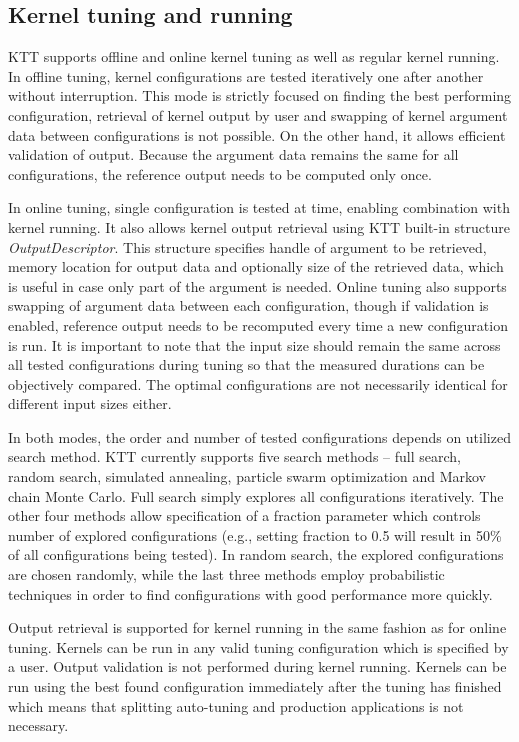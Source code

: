 \documentclass
[
    digital, %
    oneside, %
    table, %
    nolof, %
    nolot, %
    nocover %
]{fithesis3}
\begin{document}
\subsection{Kernel tuning and running}
KTT supports offline and online kernel tuning as well as regular kernel running. In offline tuning, kernel configurations are tested iteratively one
after another without interruption. This mode is strictly focused on finding the best performing configuration, retrieval of kernel output by user and
swapping of kernel argument data between configurations is not possible. On the other hand, it allows efficient validation of output. Because the
argument data remains the same for all configurations, the reference output needs to be computed only once.

In online tuning, single configuration is tested at time, enabling combination with kernel running. It also allows kernel output retrieval using
KTT built-in structure \textit{OutputDescriptor}. This structure specifies handle of argument to be retrieved, memory location for output data and
optionally size of the retrieved data, which is useful in case only part of the argument is needed. Online tuning also supports swapping of argument
data between each configuration, though if validation is enabled, reference output needs to be recomputed every time a new configuration is run.
It is important to note that the input size should remain the same across all tested configurations during tuning so that the measured durations
can be objectively compared. The optimal configurations are not necessarily identical for different input sizes either.

In both modes, the order and number of tested configurations depends on utilized search method. KTT currently supports five search methods -- full
search, random search, simulated annealing, particle swarm optimization and Markov chain Monte Carlo. Full search simply explores all configurations
iteratively. The other four methods allow specification of a fraction parameter which controls number of explored configurations (e.g., setting fraction
to 0.5 will result in 50\% of all configurations being tested). In random search, the explored configurations are chosen randomly, while the last three
methods employ probabilistic techniques in order to find configurations with good performance more quickly.

Output retrieval is supported for kernel running in the same fashion as for online tuning. Kernels can be run in any valid tuning configuration which is
specified by a user. Output validation is not performed during kernel running. Kernels can be run using the best found configuration immediately after the
tuning has finished which means that splitting auto-tuning and production applications is not necessary.
\end{document}
